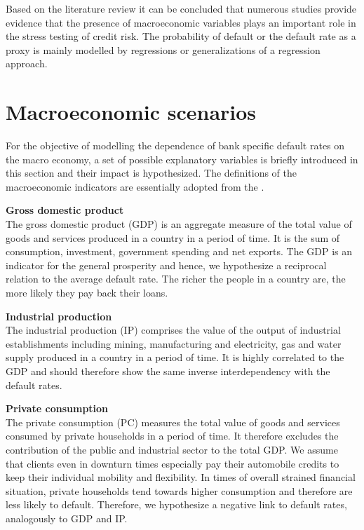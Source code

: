 \documentclass[a4paper, 12pt]{scrreprt}
\begin{document}
Based on the literature review it can be concluded that numerous studies provide evidence that the presence of macroeconomic variables plays an important role in the stress testing of credit risk. The probability of default or the default rate as a proxy is mainly modelled by regressions or generalizations of a regression approach.



\section{Macroeconomic scenarios}\label{par:scenarios}

For the objective of modelling the dependence of bank specific default rates on the macro economy, a set of possible explanatory variables is briefly introduced in this section and their impact is hypothesized.
The definitions of the macroeconomic indicators are essentially adopted from the \textcite{oecd2016factbook}.

\bigskip 

\textbf{Gross domestic product} \\
The gross domestic product (GDP) is an aggregate measure of the total value of goods and services produced in a country in a period of time. It is the sum of consumption, investment, government spending and net exports. The GDP is an indicator for the general prosperity and hence, we hypothesize a reciprocal relation to the average default rate. The richer the people in a country are, the more likely they pay back their loans.

\bigskip 

\textbf{Industrial production} \\
The industrial production (IP) comprises the value of the output of industrial establishments including mining, manufacturing and electricity, gas and water supply produced in a country in a period of time. It is highly correlated to the GDP and should therefore show the same inverse interdependency with the default rates.

\bigskip

\textbf{Private consumption} \\
The private consumption (PC) measures the total value of goods and services consumed by private households in a period of time. It therefore excludes the contribution of the public and industrial sector to the total GDP. 
We assume that clients even in downturn times especially pay their automobile credits to keep their individual mobility and flexibility. 
In times of overall strained financial situation, private households tend towards higher consumption and therefore are less likely to default. 
Therefore, we hypothesize a negative link to default rates, analogously to GDP and IP. 
\end{document}
